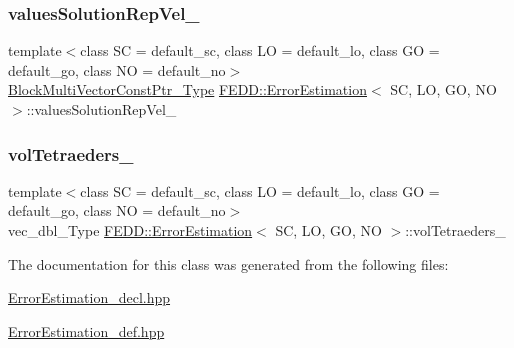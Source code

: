 \mbox{\label{classFEDD_1_1ErrorEstimation_aa8db6776c27cc0a72e1b0709a8bc736c}} 
\subsubsection{\texorpdfstring{values\+Solution\+Rep\+Vel\+\_\+}{valuesSolutionRepVel\_}}
{\footnotesize\ttfamily template$<$class SC = default\+\_\+sc, class LO = default\+\_\+lo, class GO = default\+\_\+go, class NO = default\+\_\+no$>$ \\
\hyperlink{classFEDD_1_1ErrorEstimation_a8a53d809dfcf71abaffe46f85e6b4aa1}{Block\+Multi\+Vector\+Const\+Ptr\+\_\+\+Type} \hyperlink{classFEDD_1_1ErrorEstimation}{F\+E\+D\+D\+::\+Error\+Estimation}$<$ SC, LO, GO, NO $>$\+::values\+Solution\+Rep\+Vel\+\_\+\hspace{0.3cm}{\ttfamily [protected]}}

\mbox{\label{classFEDD_1_1ErrorEstimation_a85be16035eebc82df031a58d7cdf8e8e}} 
\subsubsection{\texorpdfstring{vol\+Tetraeders\+\_\+}{volTetraeders\_}}
{\footnotesize\ttfamily template$<$class SC = default\+\_\+sc, class LO = default\+\_\+lo, class GO = default\+\_\+go, class NO = default\+\_\+no$>$ \\
vec\+\_\+dbl\+\_\+\+Type \hyperlink{classFEDD_1_1ErrorEstimation}{F\+E\+D\+D\+::\+Error\+Estimation}$<$ SC, LO, GO, NO $>$\+::vol\+Tetraeders\+\_\+\hspace{0.3cm}{\ttfamily [protected]}}



The documentation for this class was generated from the following files\+:\begin{DoxyCompactItemize}
\item 
\hyperlink{ErrorEstimation__decl_8hpp}{Error\+Estimation\+\_\+decl.\+hpp}\item 
\hyperlink{ErrorEstimation__def_8hpp}{Error\+Estimation\+\_\+def.\+hpp}\end{DoxyCompactItemize}
